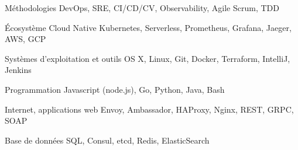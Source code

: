 
\begin{cvskills}

  \cvskill
    {Méthodologies} %
    {DevOps, SRE, CI/CD/CV, Observability, Agile Scrum, TDD} %

  \cvskill
    {Écosystème Cloud Native} %
    {Kubernetes, Serverless, Prometheus, Grafana, Jaeger, AWS, GCP} %

  \cvskill
    {Systèmes d'exploitation et outils} %
    {OS X, Linux, Git, Docker, Terraform, IntelliJ, Jenkins} %

  \cvskill
    {Programmation} %
    {Javascript (node.js), Go, Python, Java, Bash} %

  \cvskill
    {Internet, applications web} %
    {Envoy, Ambassador, HAProxy, Nginx, REST, GRPC, SOAP} %

  \cvskill
    {Base de données} %
    {SQL, Consul, etcd, Redis, ElasticSearch} %

\end{cvskills}